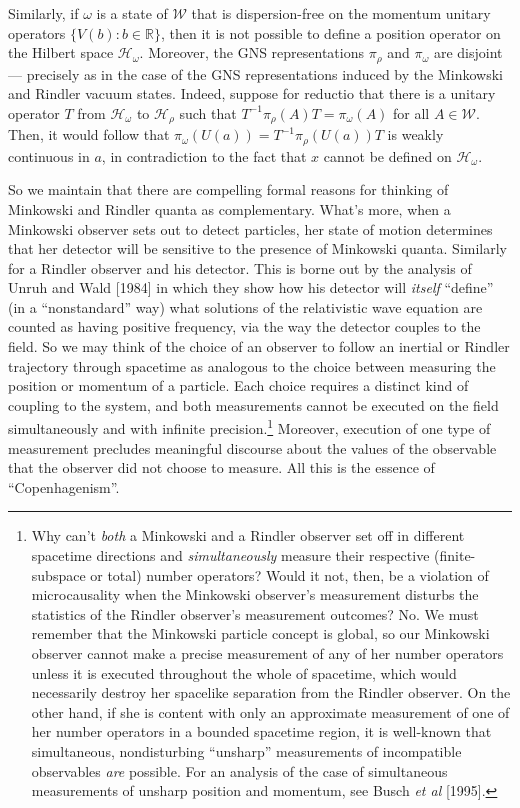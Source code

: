 \documentclass[12pt]{article}
\theoremstyle{remark}
\theoremstyle{definition}
\newcommand{\alg}[1]{\mathcal{#1}}
\newcommand{\hil}[1]{\mathcal{#1}}
\begin{document}
Similarly, if $\omega$ is a state of $\alg{W}$ that is dispersion-free
on the momentum unitary operators $\{ V(b):b\in \mathbb{R} \}$, then
it is not possible to define a position operator on the Hilbert space
$\hil{H}_{\omega}$.  Moreover, the GNS representations $\pi _{\rho}$
and $\pi _{\omega}$ are disjoint --- precisely as in the case of the
GNS representations induced by the Minkowski and Rindler vacuum
states.  Indeed, suppose for reductio that there is a unitary operator
$T$ from $\hil{H}_{\omega}$ to $\hil{H}_{\rho}$ such that $T^{-1}\pi
_{\rho}(A)T=\pi _{\omega }(A)$ for all $A\in \alg{W}$.  Then, it would
follow that $\pi _{\omega }(U(a))=T^{-1}\pi _{\rho }(U(a))T$ is weakly
continuous in $a$, in contradiction to the fact that $x$ cannot be
defined on $\hil{H}_{\omega}$.
 
So we maintain that there are compelling formal reasons for thinking of
Minkowski and Rindler quanta as complementary.  What's more, when a
Minkowski observer sets out to detect particles, her state of motion
determines that her detector will be sensitive to the presence of
Minkowski quanta.  Similarly for a Rindler observer and his detector.
This is borne out by the analysis of Unruh and Wald [1984] in which
they show how his detector will \emph{itself} ``define'' (in a
``nonstandard'' way) what solutions of the relativistic wave equation
are counted as having positive frequency, via the way the detector
couples to the field. So we may think of the choice of an observer to
follow an inertial or Rindler trajectory through spacetime as
analogous to the choice between measuring the position or momentum of
a particle.  Each choice requires a distinct kind of coupling to the
system, and both measurements cannot be executed on the field
simultaneously and with infinite precision.\footnote{Why can't
  \emph{both} a Minkowski and a Rindler observer set off in different
  spacetime directions and \emph{simultaneously} measure their
  respective (finite-subspace or total) number operators?  Would it
  not, then, be a violation of microcausality when the Minkowski
  observer's measurement disturbs the statistics of the Rindler
  observer's measurement outcomes?  No.  We must remember that the
  Minkowski particle concept is global, so our Minkowski observer
  cannot make a precise measurement of any of her number operators
  unless it is executed throughout the whole of spacetime, which would
  necessarily destroy her spacelike separation from the Rindler
  observer.  On the other hand, if she is content with only an
  approximate measurement of one of her number operators in a bounded
  spacetime region, it is well-known that simultaneous, nondisturbing
  ``unsharp'' measurements of incompatible observables \emph{are}
  possible.  For an analysis of the case of simultaneous measurements
  of unsharp position and momentum, see Busch \emph{et al} [1995].}
Moreover, execution of one type of measurement precludes meaningful
discourse about the values of the observable that the observer did not
choose to measure. All this is the essence of ``Copenhagenism''.
 
\end{document}
